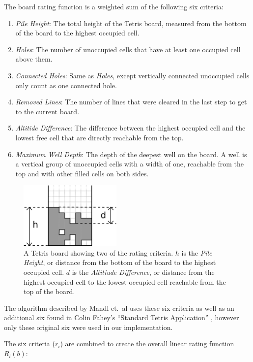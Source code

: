 \documentclass[a4paper,12pt]{article}
\begin{document}
The board rating function is a weighted sum of the following six criteria:

\begin{enumerate}
  \item \emph{Pile Height}: The total height of the Tetris board, measured from
      the bottom of the board to the highest occupied cell.
  \item \emph{Holes}: The number of unoccupied cells that have at least one
      occupied cell above them.
  \item \emph{Connected Holes}: Same as \emph{Holes}, except vertically
      connected unoccupied cells only count as one connected hole.
  \item \emph{Removed Lines}: The number of lines that were cleared in the last
      step to get to the current board.
  \item \emph{Altitide Difference}: The difference between the highest occupied
      cell and the lowest free cell that are directly reachable from the top.
  \item \emph{Maximum Well Depth}: The depth of the deepest well on the board.
      A well is a vertical group of unoccupied cells with a width of one,
      reachable from the top and with other filled cells on both sides.
\end{enumerate}

\begin{figure}[hb]
  \centering
  \includegraphics[width=5cm]{boards1.png}
  \caption{A Tetris board showing two of the rating criteria.  $h$ is
      the \emph{Pile Height}, or distance from the bottom of the board to
      the highest occupied cell.  $d$ is the \emph{Altitiude Difference}, or
      distance from the highest occupied cell to the lowest occupied cell
      reachable from the top of the board.}
  \label{BoardRating}
\end{figure}

The algorithm described by Mandl et.\ al uses these six criteria as well as
an additional six found in Colin Fahey's ``Standard Tetris Application''
\cite{TetrisAI}, however only these original six were used in our
implementation.

The six criteria ($r_i$) are combined to create the overall linear rating
function $R_l(b)$:
\end{document}
